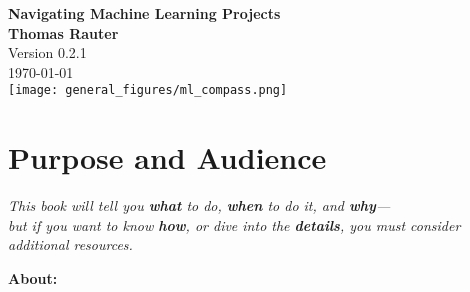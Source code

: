 \documentclass[12pt,openany]{book}
\begin{document}
\begin{titlepage}
    \centering
    \newpage
    \thispagestyle{empty}
    
    
    \vspace*{2cm}
    {\LARGE \textbf{\textcolor{darknavy}{Navigating Machine Learning Projects}}} \\

    
    \vspace{2cm}  %
    \Large{\textcolor{darknavy}{\textbf{Thomas Rauter}}} \\
    
    \vspace{0.5cm}
    \large{\textcolor{darknavy}{Version 0.2.1}} \\
    \large{\textcolor{darknavy}{\today}} \\
    
    \vspace{1.5cm}
    \texttt{[image: general\_figures/ml\_compass.png]} \\
    
\end{titlepage}


\setcounter{tocdepth}{1}

\tableofcontents

\newpage

\section{Purpose and Audience}

\begin{center}
\textit{This book will tell you \textcolor{green!50!black}{\textbf{what}} to do, \textcolor{green!50!black}{\textbf{when}} to do it, and \textcolor{green!50!black}{\textbf{why}}—\\
but if you want to know \textcolor{red!70!black}{\textbf{how}}, or dive into the \textcolor{red!70!black}{\textbf{details}}, you must consider additional resources.}
\end{center}

\vspace{1em}
\textbf{About:}
\end{document}
